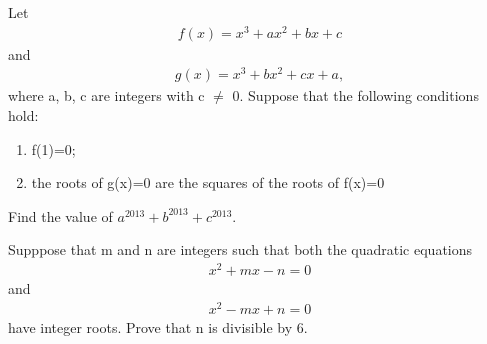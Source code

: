 \item Let 
\begin{align*}
f(x) = x^3 + ax^2 + bx + c
\end{align*}
and
\begin{align*} 
g(x) = x^3 + bx^2 + cx + a,
\end{align*}
where a, b, c are integers with c $\neq$ 0. Suppose that the following conditions hold:
\begin{enumerate}
\item f(1)=0;
\item the roots of g(x)=0 are the squares of the roots of f(x)=0
\end{enumerate}
Find the value of $a^{2013} + b^{2013} + c^{2013}$.

\item Supppose that m and n are integers such that both the quadratic equations
\begin{align} 
x^2 + mx - n = 0
\end{align}
and 
\begin{align}
x^2 - mx + n = 0
\end{align} 
have integer roots. Prove that n is divisible by 6.
